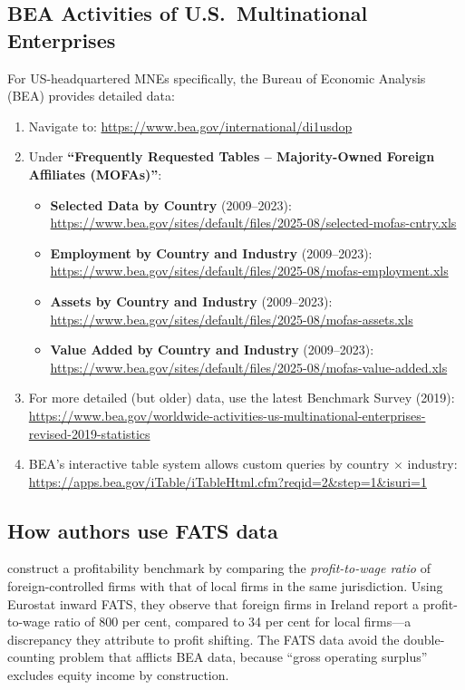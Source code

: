 \documentclass[12pt,a4paper]{article}
\begin{document}
\subsection{BEA Activities of U.S.\ Multinational Enterprises}

For US-headquartered MNEs specifically, the Bureau of Economic Analysis (BEA) provides detailed data:

\begin{enumerate}
\item Navigate to: \url{https://www.bea.gov/international/di1usdop}
\item Under \textbf{``Frequently Requested Tables -- Majority-Owned Foreign Affiliates (MOFAs)''}:
\begin{itemize}
    \item \textbf{Selected Data by Country} (2009--2023):\\
    \url{https://www.bea.gov/sites/default/files/2025-08/selected-mofas-cntry.xls}
    \item \textbf{Employment by Country and Industry} (2009--2023):\\
    \url{https://www.bea.gov/sites/default/files/2025-08/mofas-employment.xls}
    \item \textbf{Assets by Country and Industry} (2009--2023):\\
    \url{https://www.bea.gov/sites/default/files/2025-08/mofas-assets.xls}
    \item \textbf{Value Added by Country and Industry} (2009--2023):\\
    \url{https://www.bea.gov/sites/default/files/2025-08/mofas-value-added.xls}
\end{itemize}
\item For more detailed (but older) data, use the latest Benchmark Survey (2019):\\
\url{https://www.bea.gov/worldwide-activities-us-multinational-enterprises-revised-2019-statistics}
\item BEA's interactive table system allows custom queries by country $\times$ industry:\\
\url{https://apps.bea.gov/iTable/iTableHtml.cfm?reqid=2&step=1&isuri=1}
\end{enumerate}

\subsection{How authors use FATS data}

\textcite{torslov2022} construct a profitability benchmark by comparing the \emph{profit-to-wage ratio} of foreign-controlled firms with that of local firms in the same jurisdiction.
Using Eurostat inward FATS, they observe that foreign firms in Ireland report a profit-to-wage ratio of 800 per cent, compared to 34 per cent for local firms---a discrepancy they attribute to profit shifting.
The FATS data avoid the double-counting problem that afflicts BEA data, because ``gross operating surplus'' excludes equity income by construction.
\end{document}

